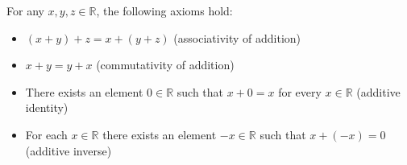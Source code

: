 For any $x, y, z \in \mathbb{R}$, the following axioms hold:
\begin{itemize}
\item[A1.] $(x + y) + z = x + (y + z)$ \hfill (associativity of addition)
\item[A2.] $x + y = y + x$ \hfill (commutativity of addition)
\item[A3.] There exists an element $0 \in \mathbb{R}$ such that $x + 0 = x$ for every $x \in \mathbb{R}$ \hfill (additive identity)
\item[A4.] For each $x \in \mathbb{R}$ there exists an element $-x \in \mathbb{R}$ such that $x + (-x) = 0$ \hfill (additive inverse)
\end{itemize}
